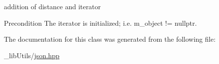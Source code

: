 addition of distance and iterator 

\begin{DoxyPrecond}{Precondition}
The iterator is initialized; i.\+e. {\ttfamily m\+\_\+object != nullptr}. 
\end{DoxyPrecond}


The documentation for this class was generated from the following file\+:\begin{DoxyCompactItemize}
\item 
\+\_\+lib\+Utils/\hyperlink{json_8hpp}{json.\+hpp}\end{DoxyCompactItemize}
